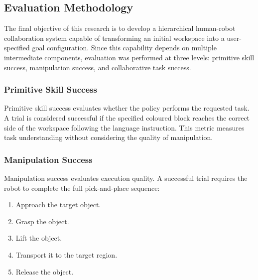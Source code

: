 \documentclass[conference, 12pt]{IEEEtran}
\begin{document}

\subsection{Evaluation Methodology}

The final objective of this research is to develop a hierarchical human-robot collaboration system capable of transforming an initial workspace into a user-specified goal configuration. Since this capability depends on multiple intermediate components, evaluation was performed at three levels: primitive skill success, manipulation success, and collaborative task success.

\subsubsection{Primitive Skill Success}

Primitive skill success evaluates whether the policy performs the requested task. A trial is considered successful if the specified coloured block reaches the correct side of the workspace following the language instruction. This metric measures task understanding without considering the quality of manipulation.

\subsubsection{Manipulation Success}

Manipulation success evaluates execution quality. A successful trial requires the robot to complete the full pick-and-place sequence:

\begin{enumerate}
\item Approach the target object.
\item Grasp the object.
\item Lift the object.
\item Transport it to the target region.
\item Release the object.
\end{enumerate}
\end{document}
